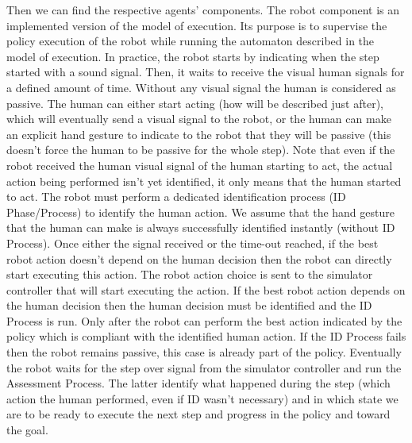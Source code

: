 Then we can find the respective agents' components. The robot component is an implemented version of the model of execution. Its purpose is to supervise the policy execution of the robot while running the automaton described in the model of execution. In practice, the robot starts by indicating when the step started with a sound signal. Then, it waits to receive the visual human signals for a defined amount of time. Without any visual signal the human is considered as passive. The human can either start acting (how will be described just after), which will eventually send a visual signal to the robot, or the human can make an explicit hand gesture to indicate to the robot that they will be passive (this doesn't force the human to be passive for the whole step). Note that even if the robot received the human visual signal of the human starting to act, the actual action being performed isn't yet identified, it only means that the human started to act. The robot must perform a dedicated identification process (ID Phase/Process) to identify the human action. We assume that the hand gesture that the human can make is always successfully identified instantly (without ID Process). Once either the signal received or the time-out reached, if the best robot action doesn't depend on the human decision then the robot can directly start executing this action. The robot action choice is sent to the simulator controller that will start executing the action. If the best robot action depends on the human decision then the human decision must be identified and the ID Process is run. Only after the robot can perform the best action indicated by the policy which is compliant with the identified human action. If the ID Process fails then the robot remains passive, this case is already part of the policy.
Eventually the robot waits for the step over signal from the simulator controller and run the Assessment Process. The latter identify what happened during the step (which action the human performed, even if ID wasn't necessary) and in which state we are to be ready to execute the next step and progress in the policy and toward the goal. 

